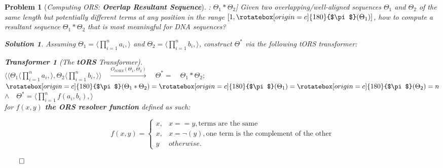 \documentclass[a4paper, 18pt]{book} %
\newtheorem{transf}{Transformer}
\newtheorem{prob}{Problem}
\newtheorem{soln}{Solution}
\newcommand{\invpi}{\rotatebox[origin=c]{180}{$\pi$}}
\begin{document}
\begin{prob}[\textit{Computing ORS: \textbf{Overlap Resultant Sequence}}]: $\Theta_1 \ast \Theta_2$] 
\label{PROBORS}
Given two overlapping/well-aligned sequences $\Theta_1$ and $\Theta_2$ of the same length but potentially different terms at any position in the range $[1, \invpi(\Theta_1)]$, how to compute a resultant sequence $\Theta_1 \ast \Theta_2$ that is most meaningful for DNA sequences?

\vspace{1em}
\begin{soln}
\label{SOLORS}
Assuming $\Theta_1 = \langle \prod\limits_{i=1}^n a_i, \rangle$ and $\Theta_2 = \langle \prod\limits_{i=1}^n b_i, \rangle$, construct $\Theta^*$ via the following tORS transformer:

\begin{transf}[The \textbf{tORS} Transformer]$ $\\
\label{TRANSFORS}
$\langle\langle \Theta_1\langle \prod\limits_{i=1}^n a_i, \rangle, \Theta_2\langle \prod\limits_{i=1}^n b_i, \rangle \rangle  \quad \xrightarrow{O_{tORS}(\Theta_1,\Theta_2)} \quad \Theta^* = 	 \quad \Theta_1 \ast \Theta_2;$\\
$\invpi(\Theta_1 \ast \Theta_2) = \invpi(\Theta_1) = \invpi(\Theta_2) = n$\\
$\land \quad \Theta^* = \langle \prod\limits_{i=1}^n f(a_i,b_i), \rangle$\\
 for $f(x,y)$ \textbf{the ORS resolver function} defined as such:

\[
f(x,y) = 
\begin{cases}
x, & x == y, \text{terms are the same}\\
x, & x = \lnot(y), \text{one term is the complement of the other}\\
y & otherwise.
\end{cases}
\]

\end{transf}
$\qed$
\vspace{2em}
\end{soln}
\end{prob}

\vspace{2em}
\end{document}
